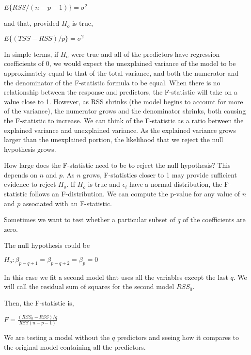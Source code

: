 \documentclass[]{book}
\begin{document}
\(E\{RSS/(n-p-1)\} = \sigma^2\)

and that, provided \(H_o\) is true,

\(E\{(TSS-RSS)/p\} = \sigma^2\)

In simple terms, if \(H_o\) were true and all of the predictors have regression coefficients of 0, we would expect the unexplained variance of the model to be approximately equal to that of the total variance, and both the numerator and the denominator of the F-statistic formula to be equal. When there is no relationship between the response and predictors, the F-statistic will take on a value close to 1. However, as RSS shrinks (the model begins to account for more of the variance), the numerator grows and the denominator shrinks, both causing the F-statistic to increase. We can think of the F-statistic as a ratio between the explained variance and unexplained variance. As the explained variance grows larger than the unexplained portion, the likelihood that we reject the null hypothesis grows.

How large does the F-statistic need to be to reject the null hypothesis? This depends on \(n\) and \(p\). As \(n\) grows, F-statistics closer to 1 may provide sufficient evidence to reject \(H_o\). If \(H_o\) is true and \(\epsilon_i\) have a normal distribution, the F-statistic follows an F-distribution. We can compute the p-value for any value of \(n\) and \(p\) associated with an F-statistic.

Sometimes we want to test whether a particular subset of \(q\) of the coefficients are zero.

The null hypothesis could be

\(H_o : \beta_{p-q+1} = \beta_{p-q+2} = \beta_p = 0\)

In this case we fit a second model that uses all the variables except the last \(q\). We will call the residual sum of squares for the second model \(RSS_0\).

Then, the F-statistic is,

\(F = \frac{(RSS_0 - RSS)/q}{RSS(n-p-1)}\)

We are testing a model without the \(q\) predictors and seeing how it compares to the original model containing all the predictors.
\end{document}
